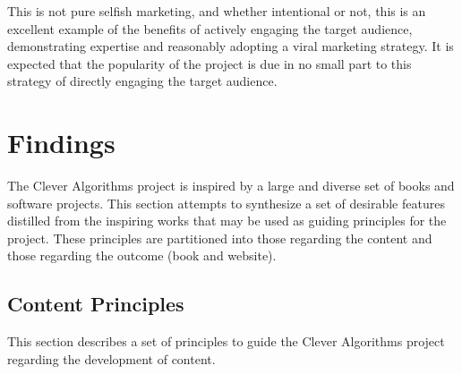 \documentclass[a4paper, 11pt]{article}
\begin{document}
This is not pure selfish marketing, and whether intentional or not, this is an excellent example of the benefits of actively engaging the target audience, demonstrating expertise and reasonably adopting a viral marketing strategy. It is expected that the popularity of the project is due in no small part to this strategy of directly engaging the target audience.

% 
% 
\section{Findings}
\label{sec:findings}
The Clever Algorithms project is inspired by a large and diverse set of books and software projects. This section attempts to synthesize a set of desirable features distilled from the inspiring works that may be used as guiding principles for the project. These principles are partitioned into those regarding the content and those regarding the outcome (book and website).

\subsection{Content Principles}
This section describes a set of principles to guide the Clever Algorithms project regarding the development of content.
\end{document}
